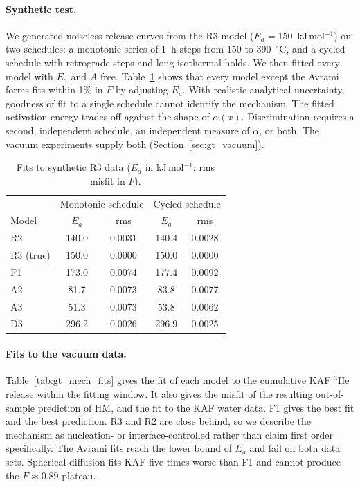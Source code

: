 \paragraph{Synthetic test.} We generated noiseless release curves from the R3 model
($E_a = 150$~kJ\,mol$^{-1}$) on two schedules: a monotonic series of 1~h steps from 150 to
390~$^\circ$C, and a cycled schedule with retrograde steps and long isothermal holds. We then
fitted every model with $E_a$ and $A$ free. Table~\ref{tab:gt_synth} shows that every model
except the Avrami forms fits within 1\% in $F$ by adjusting $E_a$. With realistic analytical
uncertainty, goodness of fit to a single schedule cannot identify the mechanism. The fitted
activation energy trades off against the shape of $\alpha(x)$. Discrimination requires a second,
independent schedule, an independent measure of $\alpha$, or both. The vacuum experiments supply
both (Section~\ref{sec:gt_vacuum}).

\begin{table}
  \centering
  \caption{Fits to synthetic R3 data ($E_a$ in kJ\,mol$^{-1}$; rms misfit in $F$).}
  \label{tab:gt_synth}
  \begin{tabular}{lcccc}
    \hline
    & \multicolumn{2}{c}{Monotonic schedule} & \multicolumn{2}{c}{Cycled schedule} \\
    Model & $E_a$ & rms & $E_a$ & rms \\
    \hline
    R2 & 140.0 & 0.0031 & 140.4 & 0.0028 \\
    R3 (true) & 150.0 & 0.0000 & 150.0 & 0.0000 \\
    F1 & 173.0 & 0.0074 & 177.4 & 0.0092 \\
    A2 & 81.7 & 0.0073 & 83.8 & 0.0077 \\
    A3 & 51.3 & 0.0073 & 53.8 & 0.0062 \\
    D3 & 296.2 & 0.0026 & 296.9 & 0.0025 \\
    \hline
  \end{tabular}
\end{table}

\paragraph{Fits to the vacuum data.} Table~\ref{tab:gt_mech_fits} gives the fit of each model to
the cumulative KAF $^3$He release within the fitting window. It also gives the misfit of the
resulting out-of-sample prediction of HM, and the fit to the KAF water data. F1 gives the best
fit and the best prediction. R3 and R2 are close behind, so we describe the mechanism as
nucleation- or interface-controlled rather than claim first order specifically. The Avrami
fits reach the lower bound of $E_a$ and fail on both data sets. Spherical diffusion fits KAF
five times worse than F1 and cannot produce the $F\approx0.89$ plateau.

